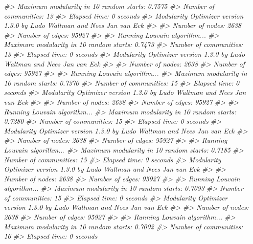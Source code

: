 \documentclass[
]{book}
\newenvironment{Shaded}{\begin{snugshade}}{\end{snugshade}}
\newcommand{\CommentTok}[1]{\textcolor[rgb]{0.56,0.35,0.01}{\textit{#1}}}
\begin{document}
\begin{Shaded}
\begin{Highlighting}[]
\CommentTok{\#\textgreater{} Maximum modularity in 10 random starts: 0.7575}
\CommentTok{\#\textgreater{} Number of communities: 13}
\CommentTok{\#\textgreater{} Elapsed time: 0 seconds}
\CommentTok{\#\textgreater{} Modularity Optimizer version 1.3.0 by Ludo Waltman and Nees Jan van Eck}
\CommentTok{\#\textgreater{} }
\CommentTok{\#\textgreater{} Number of nodes: 2638}
\CommentTok{\#\textgreater{} Number of edges: 95927}
\CommentTok{\#\textgreater{} }
\CommentTok{\#\textgreater{} Running Louvain algorithm...}
\CommentTok{\#\textgreater{} Maximum modularity in 10 random starts: 0.7473}
\CommentTok{\#\textgreater{} Number of communities: 13}
\CommentTok{\#\textgreater{} Elapsed time: 0 seconds}
\CommentTok{\#\textgreater{} Modularity Optimizer version 1.3.0 by Ludo Waltman and Nees Jan van Eck}
\CommentTok{\#\textgreater{} }
\CommentTok{\#\textgreater{} Number of nodes: 2638}
\CommentTok{\#\textgreater{} Number of edges: 95927}
\CommentTok{\#\textgreater{} }
\CommentTok{\#\textgreater{} Running Louvain algorithm...}
\CommentTok{\#\textgreater{} Maximum modularity in 10 random starts: 0.7370}
\CommentTok{\#\textgreater{} Number of communities: 15}
\CommentTok{\#\textgreater{} Elapsed time: 0 seconds}
\CommentTok{\#\textgreater{} Modularity Optimizer version 1.3.0 by Ludo Waltman and Nees Jan van Eck}
\CommentTok{\#\textgreater{} }
\CommentTok{\#\textgreater{} Number of nodes: 2638}
\CommentTok{\#\textgreater{} Number of edges: 95927}
\CommentTok{\#\textgreater{} }
\CommentTok{\#\textgreater{} Running Louvain algorithm...}
\CommentTok{\#\textgreater{} Maximum modularity in 10 random starts: 0.7280}
\CommentTok{\#\textgreater{} Number of communities: 15}
\CommentTok{\#\textgreater{} Elapsed time: 0 seconds}
\CommentTok{\#\textgreater{} Modularity Optimizer version 1.3.0 by Ludo Waltman and Nees Jan van Eck}
\CommentTok{\#\textgreater{} }
\CommentTok{\#\textgreater{} Number of nodes: 2638}
\CommentTok{\#\textgreater{} Number of edges: 95927}
\CommentTok{\#\textgreater{} }
\CommentTok{\#\textgreater{} Running Louvain algorithm...}
\CommentTok{\#\textgreater{} Maximum modularity in 10 random starts: 0.7185}
\CommentTok{\#\textgreater{} Number of communities: 15}
\CommentTok{\#\textgreater{} Elapsed time: 0 seconds}
\CommentTok{\#\textgreater{} Modularity Optimizer version 1.3.0 by Ludo Waltman and Nees Jan van Eck}
\CommentTok{\#\textgreater{} }
\CommentTok{\#\textgreater{} Number of nodes: 2638}
\CommentTok{\#\textgreater{} Number of edges: 95927}
\CommentTok{\#\textgreater{} }
\CommentTok{\#\textgreater{} Running Louvain algorithm...}
\CommentTok{\#\textgreater{} Maximum modularity in 10 random starts: 0.7093}
\CommentTok{\#\textgreater{} Number of communities: 15}
\CommentTok{\#\textgreater{} Elapsed time: 0 seconds}
\CommentTok{\#\textgreater{} Modularity Optimizer version 1.3.0 by Ludo Waltman and Nees Jan van Eck}
\CommentTok{\#\textgreater{} }
\CommentTok{\#\textgreater{} Number of nodes: 2638}
\CommentTok{\#\textgreater{} Number of edges: 95927}
\CommentTok{\#\textgreater{} }
\CommentTok{\#\textgreater{} Running Louvain algorithm...}
\CommentTok{\#\textgreater{} Maximum modularity in 10 random starts: 0.7002}
\CommentTok{\#\textgreater{} Number of communities: 16}
\CommentTok{\#\textgreater{} Elapsed time: 0 seconds}


\end{Highlighting}
\end{Shaded}
\end{document}
